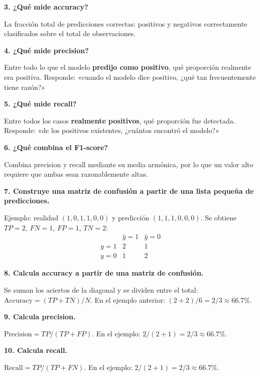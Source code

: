 \documentclass[11pt]{article}
\newcommand{\pregunta}[1]{\vspace{2mm}\textbf{#1}}
\begin{document}
\pregunta{3. ¿Qué mide accuracy?}
\begin{respuesta}
La fracción total de predicciones correctas: positivos y negativos correctamente clasificados sobre el total de observaciones.
\end{respuesta}

\pregunta{4. ¿Qué mide precision?}
\begin{respuesta}
Entre todo lo que el modelo \textbf{predijo como positivo}, qué proporción realmente era positiva. Responde: «cuando el modelo dice positivo, ¿qué tan frecuentemente tiene razón?»
\end{respuesta}

\pregunta{5. ¿Qué mide recall?}
\begin{respuesta}
Entre todos los casos \textbf{realmente positivos}, qué proporción fue detectada. Responde: «de los positivos existentes, ¿cuántos encontró el modelo?»
\end{respuesta}

\pregunta{6. ¿Qué combina el F1-score?}
\begin{respuesta}
Combina precision y recall mediante su media armónica, por lo que un valor alto requiere que ambas sean razonablemente altas.
\end{respuesta}

\pregunta{7. Construye una matriz de confusión a partir de una lista pequeña de predicciones.}
\begin{respuesta}
Ejemplo: realidad $(1,0,1,1,0,0)$ y predicción $(1,1,1,0,0,0)$. Se obtiene $TP=2$, $FN=1$, $FP=1$, $TN=2$:
\[
\begin{array}{c|cc}
&\hat y=1&\hat y=0\\\hline
y=1&2&1\\
y=0&1&2
\end{array}
\]
\end{respuesta}

\pregunta{8. Calcula accuracy a partir de una matriz de confusión.}
\begin{respuesta}
Se suman los aciertos de la diagonal y se dividen entre el total: $\mathrm{Accuracy}=(TP+TN)/N$. En el ejemplo anterior: $(2+2)/6=2/3\approx66.7\%$.
\end{respuesta}

\pregunta{9. Calcula precision.}
\begin{respuesta}
$\mathrm{Precision}=TP/(TP+FP)$. En el ejemplo: $2/(2+1)=2/3\approx66.7\%$.
\end{respuesta}

\pregunta{10. Calcula recall.}
\begin{respuesta}
$\mathrm{Recall}=TP/(TP+FN)$. En el ejemplo: $2/(2+1)=2/3\approx66.7\%$.
\end{respuesta}
\end{document}
